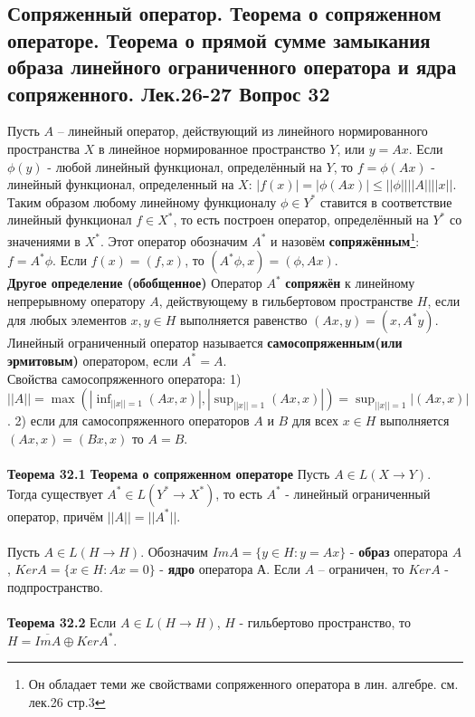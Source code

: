 \documentclass{article}
\begin{document}
\subsection{Сопряженный оператор. Теорема о сопряженном операторе. Теорема о прямой сумме замыкания образа линейного ограниченного оператора и ядра сопряженного. Лек.26-27 \textbf{Вопрос 32}}
	Пусть $A$ – линейный оператор, действующий из линейного нормированного пространства $X$ в линейное нормированное пространство $Y$, или $y=Ax$. Если $\phi(y)$ - любой линейный функционал, определённый на $Y$, то $f=\phi(Ax)$ - линейный функционал, определенный на $X$: $|f(x)|=|\phi(Ax)|\le ||\phi||||A||||x||$. Таким образом любому линейному функционалу $\phi \in {Y}^{*}$ ставится в
	соответствие линейный функционал $f \in {X}^{*}$, то есть построен оператор, определённый на ${Y}^{*}$ со значениями в ${X}^{*}$. Этот оператор обозначим ${A}^{*}$ и назовём \textbf{сопряжённым}\footnote{Он обладает теми же свойствами сопряженного оператора в лин. алгебре. см. лек.26 стр.3}: $f={A}^{*}\phi$. Если $f(x)=(f,x)$, то $({A}^{*}\phi,x)=(\phi,Ax)$.\\ 
	\textbf{Другое определение (обобщенное)} Оператор ${A}^{*}$ \textbf{сопряжён} к линейному непрерывному оператору $A$, действующему в гильбертовом пространстве $H$, если для любых элементов $x,y\in H$ выполняется равенство $(Ax,y)=(x,{A}^{*}y)$.\\
	Линейный ограниченный оператор называется \textbf{самосопряженным(или эрмитовым)} оператором, если ${A}^{*}=A$.\\
	Свойства самосопряженного оператора: 1) $||A||=\max(|\inf_{||x||=1} (Ax,x)|,|\sup_{||x||=1} (Ax,x)|)=\sup_{||x||=1} |(Ax,x)|$. 2) если для самосопряженного операторов $A$ и $B$ для всех $x\in H$ выполняется $(Ax,x)=(Bx,x)$ то $A=B$.\\
	\\
	\textbf{Теорема 32.1 Теорема о сопряженном операторе}
	Пусть $A\in L(X\rightarrow Y)$. Тогда существует ${A}^{*}\in L({Y}^{*}\rightarrow {X}^{*})$, то есть ${A}^{*}$ - линейный ограниченный оператор, причём $||A||=||{A}^{*}||$.\\
	\\
	Пусть $A\in L(H\rightarrow H)$. Обозначим $ImA=\{y\in H:y=Ax\}$ - \textbf{образ} оператора $A$, $KerA=\{x\in H:Ax=0\}$ - \textbf{ядро} оператора $А$. Если $A$ – ограничен, то $KerA$ - подпространство.\\
	\\
	\textbf{Теорема 32.2} Если $A\in L(H\rightarrow H)$, $H$ - гильбертово пространство, то $H=\overline{ImA}\oplus Ker{A}^{*}$.\\
\end{document}
